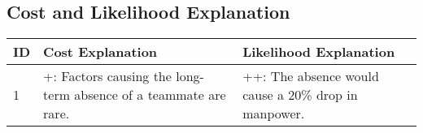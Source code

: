 \subsection{Cost and Likelihood Explanation}

\begin{center} 
	\small
	\begin{tabular}{  p{} p{} p{}}
		\toprule
		\textbf{ID} & \textbf{Cost Explanation} & \textbf{Likelihood Explanation} 		 \\ 
		\midrule
		1 &
		+: Factors causing the long-term absence of a teammate are rare.  &
		++: The absence would cause a 20\% drop in manpower. \\
		
		\bottomrule
	\end{tabular}
\end{center}